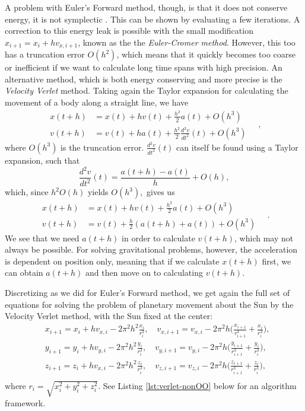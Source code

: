 \documentclass[]{article}
\begin{document}
A problem with Euler's Forward method, though, is that it does not conserve energy, it is not symplectic \cite{notes-10-02}. This can be shown by evaluating a few iterations. A correction to this energy leak is possible with the small modification $x_{i+1} = x_i + hv_{x,i+1}$, known as the the \textit{Euler-Cromer method}. However, this too has a truncation error $O(h^2)$, which means that it quickly becomes too coarse or inefficient if we want to calculate long time spans with high precision. An alternative method, which is both energy conserving and more precise is the \textit{Velocity Verlet} method. Taking again the Taylor expansion for calculating the movement of a body along a straight line, we have
\begin{equation}
\begin{aligned}
	x(t+h) &= x(t) + hv(t) + \frac{h^2}{2}a(t) + O(h^3) \\
	v(t+h) &= v(t) + ha(t) + \frac{h^2}{2}\frac{d^2v}{dt^2}(t) + O(h^3)
\end{aligned} \quad ,
\end{equation}
where $O(h^3)$ is the truncation error. $\frac{d^2v}{dt^2}(t)$ can itself be found using a Taylor expansion, such that
\begin{equation}
	\frac{d^2v}{dt^2}(t) = \frac{a(t+h) - a(t)}{h} + O(h),
\end{equation}
which, since $h^2O(h)$ yields $O(h^3)$, gives us 
\begin{equation}
\begin{aligned}
	x(t+h) &= x(t) + hv(t) + \frac{h^2}{2}a(t) + O(h^3) \\
	v(t+h) &= v(t) + \frac{h}{2}(a(t+h) + a(t)) + O(h^3)
\end{aligned} \quad .
\end{equation}
We see that we need $a(t+h)$ in order to calculate $v(t+h)$, which may not always be possible. For solving gravitational problems, however, the acceleration is dependent on position only, meaning that if we calculate $x(t+h)$ first, we can obtain $a(t+h)$ and then move on to calculating $v(t+h)$.

Discretizing as we did for Euler's Forward method, we get again the full set of equations for solving the problem of planetary movement about the Sun by the Velocity Verlet method, with the Sun fixed at the center:
\begin{equation} \label{verlet}
\begin{aligned}
	&x_{i+1} = x_i + hv_{x,i} - 2\pi^2h^2\frac{x_i}{r_i^3} , \quad v_{x,i+1} = v_{x,i} - 2\pi^2h \bigg(\frac{x_{i+1}}{r_{i+1}^3} + \frac{x_i}{r_i^3} \bigg) ,\\
	&y_{i+1} = y_i + hv_{y,i}- 2\pi^2h^2\frac{y_i}{r_i^3} , \quad v_{y,i+1} = v_{y,i} - 2\pi^2h \bigg(\frac{y_{i+1}}{r_{i+1}^3} + \frac{y_i}{r_i^3} \bigg) ,\\
	&z_{i+1} = z_i + hv_{x,i}- 2\pi^2h^2\frac{z_i}{r_i^3} , \quad v_{z,i+1} = v_{z,i} - 2\pi^2h \bigg(\frac{z_{i+1}}{r_{i+1}^3} + \frac{z_i}{r_i^3} \bigg) ,\\
\end{aligned}
\end{equation}
where $r_i = \sqrt{x_i^2 + y_i^2 + z_i^2}$. See Listing \ref{lst:verlet-nonOO} below for an algorithm framework.
\end{document}
